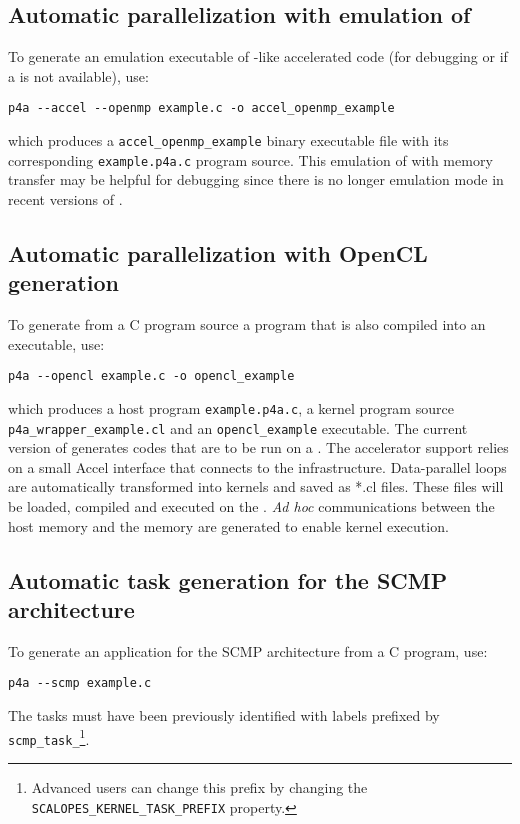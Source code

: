 \documentclass[a4paper]{article}
\begin{document}
\subsection{Automatic parallelization with \protect\Aopenmp emulation of \protect\Agpu}
\label{sec:autom-parall-with-cuda}

To generate an \Aopenmp emulation executable of \Agpu-like accelerated
code (for debugging or if a \Agpu is not available), use:
\begin{verbatim}
p4a --accel --openmp example.c -o accel_openmp_example
\end{verbatim}
which produces a \texttt{accel\_openmp\_example} binary executable file with its
corresponding \texttt{example.p4a.c} program source. This \Aopenmp
emulation of \Acuda with memory transfer may be helpful for debugging
since there is no longer emulation mode in recent versions of \Acuda.


\subsection{Automatic parallelization with OpenCL generation}
\label{sec:autom-parall-with-OpenCL}

To generate from a C program source a \Aopencl program that is also compiled
into an executable, use:
\begin{verbatim}
p4a --opencl example.c -o opencl_example
\end{verbatim}
which produces a host program \texttt{example.p4a.c}, a \Aopencl kernel program source 
\texttt{p4a\_wrapper\_example.cl} and an \texttt{opencl\_example} executable. The current version of 
\Apfa generates \Aopencl codes that are to be run on a \Agpu. 
The \Agpu accelerator support relies on a small \Apfa Accel interface that connects to the
\Aopencl infrastructure. Data-parallel loops are automatically transformed
into \Aopencl kernels and saved as *.cl files. These files 
will be loaded, compiled and executed on the \Agpu. \emph{Ad
  hoc} communications between the host memory and the \Agpu memory are
generated to enable kernel execution. 

\subsection{Automatic task generation for the SCMP architecture}
\label{sec:scmp}

To generate an application for the SCMP architecture from a C program, use:
\begin{verbatim}
p4a --scmp example.c
\end{verbatim}
The tasks must have been previously identified with labels prefixed by
\texttt{scmp\_task\_}\footnote{Advanced users can change this prefix
  by changing the \Apips \texttt{SCALOPES\_KERNEL\_TASK\_PREFIX}
  property.}.
\end{document}
